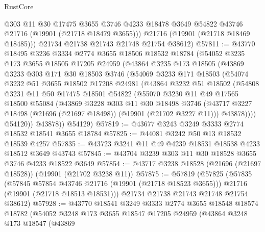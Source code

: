 \begin{lexlean}{RustCore}
\begin{coremodule}
          @303
          @11
          @30
          @17475
          @3655
          @3746
          @4233
          @18478
          @3649
          @54822
          @43746
          @21716
          (@19901 (@21718 @18479 @3655)))
        @21716
        (@19901 (@21718 @18469 @18485)))
      @21734
      @21738
      @21743
      @21748
      @21754
      @38612)
@57811 := @43770
    @18495
    @3236
    @3334
    @2774
    @3655
    @18506
    @18532
    @18784
    (@54052
      @3235
      @173
      @3655
      @18505
      @17205
      @24959
      (@43864
        @3235
        @173
        @18505
        (@43869
          @3233
          @303
          @171
          @30
          @18503
          @3746
          (@54069
            @3233
            @171
            @18503
            (@54074
              @3232
              @51
              @3655
              @18502
              @17208
              @24981
              (@43864
                @3232
                @51
                @18502
                (@54808
                  @3231
                  @11
                  @50
                  @17475
                  @18501
                  @54822
                  (@55070
                    @3230
                    @11
                    @49
                    @17565
                    @18500
                    @55084
                    (@43869
                      @3228
                      @303
                      @11
                      @30
                      @18498
                      @3746
                      (@43717 @3227 @18498 (@21696 (@21697 @18498)) (@19901 (@21702 @3227 @11)))
                      @43878))))
              @54120))
          @43878))
      @54129)
@57819 := @43677 @3243 @3249 @3333 @2774 @18532 @18541 @3655 @18784
@57825 := @44081 @3242 @50 @13 @18532 @18539 @4257
@57835 := @43723 @3241 @11 @49 @4239 @18531 @18538 @4233 @18512 @3649 @43743
@57845 := @43704 @3239 @303 @11 @30 @18528 @3655 @3746 @4233 @18522 @3649
@57854 := @43717 @3238 @18528 (@21696 (@21697 @18528)) (@19901 (@21702 @3238 @11))
@57875 := @57819
    (@57825
      (@57835
        (@57845 @57854 @43746 @21716 (@19901 (@21718 @18523 @3655)))
        @21716
        (@19901 (@21718 @18513 @18531)))
      @21734
      @21738
      @21743
      @21748
      @21754
      @38612)
@57928 := @43770
    @18541
    @3249
    @3333
    @2774
    @3655
    @18548
    @18574
    @18782
    (@54052
      @3248
      @173
      @3655
      @18547
      @17205
      @24959
      (@43864
        @3248
        @173
        @18547
        (@43869

\end{coremodule}
\end{lexlean}

